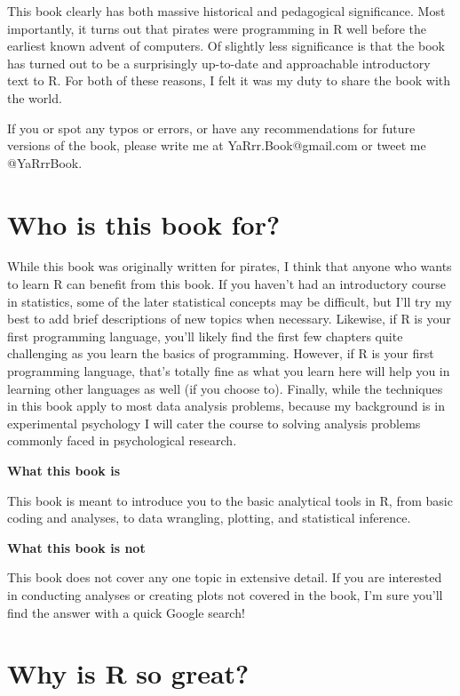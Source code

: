 \documentclass[]{book}
\begin{document}
This book clearly has both massive historical and pedagogical
significance. Most importantly, it turns out that pirates were
programming in R well before the earliest known advent of computers. Of
slightly less significance is that the book has turned out to be a
surprisingly up-to-date and approachable introductory text to R. For
both of these reasons, I felt it was my duty to share the book with the
world.

If you or spot any typos or errors, or have any recommendations for
future versions of the book, please write me at YaRrr.Book@gmail.com or
tweet me @YaRrrBook.

\section{Who is this book for?}\label{who-is-this-book-for}

While this book was originally written for pirates, I think that anyone
who wants to learn R can benefit from this book. If you haven't had an
introductory course in statistics, some of the later statistical
concepts may be difficult, but I'll try my best to add brief
descriptions of new topics when necessary. Likewise, if R is your first
programming language, you'll likely find the first few chapters quite
challenging as you learn the basics of programming. However, if R is
your first programming language, that's totally fine as what you learn
here will help you in learning other languages as well (if you choose
to). Finally, while the techniques in this book apply to most data
analysis problems, because my background is in experimental psychology I
will cater the course to solving analysis problems commonly faced in
psychological research.

\textbf{What this book is}

This book is meant to introduce you to the basic analytical tools in R,
from basic coding and analyses, to data wrangling, plotting, and
statistical inference.

\textbf{What this book is not}

This book does not cover any one topic in extensive detail. If you are
interested in conducting analyses or creating plots not covered in the
book, I'm sure you'll find the answer with a quick Google search!

\section{Why is R so great?}\label{why-is-r-so-great}
\end{document}
